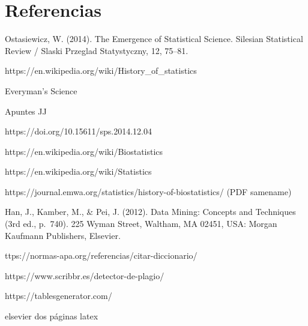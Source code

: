 \documentclass[3p,twocolumn]{elsarticle}
\begin{document}
\section{Referencias}
\renewcommand{\section}[2]{}%
\begin{thebibliography}{X}

 Ostasiewicz, W. (2014). The Emergence of Statistical Science.
Silesian Statistical Review / Slaski Przeglad Statystyczny, 12, 75--81.

 https://en.wikipedia.org/wiki/History\_of\_statistics

 Everyman's Science

 Apuntes JJ

https://doi.org/10.15611/sps.2014.12.04

https://en.wikipedia.org/wiki/Biostatistics

https://en.wikipedia.org/wiki/Statistics

https://journal.emwa.org/statistics/history-of-biostatistics/ (PDF samename)

Han, J., Kamber, M., \& Pei, J. (2012). Data Mining: Concepts and
Techniques (3rd ed., p.~740). 225 Wyman Street, Waltham, MA 02451, USA:
Morgan Kaufmann Publishers, Elsevier.

\end{thebibliography}

\section{Ayuda}

https://normas-apa.org/referencias/citar-diccionario/

https://www.scribbr.es/detector-de-plagio/

https://tablesgenerator.com/

elsevier dos páginas latex
\end{document}
